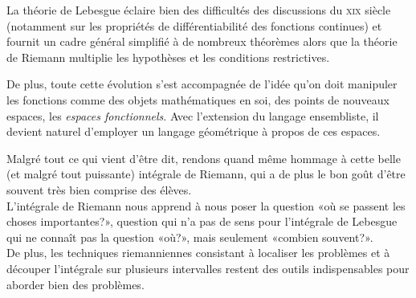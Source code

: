 \begin{histoire}
\medskip
La théorie de Lebesgue éclaire bien des difficultés des discussions du \textsc{xix} siècle (notamment sur les propriétés de différentiabilité des fonctions continues) et fournit un cadre général simplifié à de nombreux théorèmes alors que la théorie de Riemann multiplie les hypothèses et les conditions restrictives.

De plus, toute cette évolution s'est accompagnée de l'idée qu'on doit manipuler les fonctions comme des objets mathématiques en soi, des points de nouveaux espaces, les \emph{espaces fonctionnels}. Avec l'extension du langage ensembliste, il devient naturel d'employer un langage géométrique à propos de ces espaces.

\medskip
{} Malgré tout ce qui vient d'être dit, rendons quand même hommage à cette belle (et malgré tout puissante) intégrale de Riemann, qui a de plus le bon goût d'être souvent très bien comprise des élèves.\\ \indent
L'intégrale de Riemann nous apprend à nous poser la question «où se passent les choses importantes?», question qui n'a pas de sens pour l'intégrale de Lebesgue qui ne connaît pas la question «où?», mais seulement «combien souvent?».\\ \indent
De plus, les techniques riemanniennes consistant à localiser les problèmes et à découper l'intégrale sur plusieurs intervalles restent des outils indispensables pour aborder bien des problèmes.

\medskip
{}
\end{histoire}





